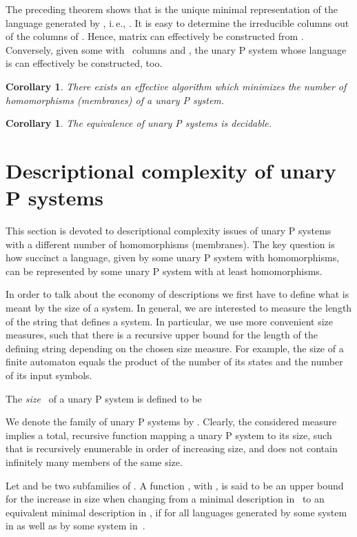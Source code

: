 \documentclass[copyright]{eptcs}
\newtheorem{corollary}[theorem]{Corollary}
\begin{document}
The preceding theorem shows that  is the unique minimal representation of the language generated
by , i.\,e., . It is easy to determine the irreducible columns out of the 
columns of . Hence, matrix  can effectively be
constructed from . Conversely, given some  with~ columns and , the unary P system  whose
language is  can
effectively be constructed, too.

\begin{corollary}
There exists an effective algorithm which minimizes the number of
homomorphisms (membranes) of a unary P system.
\end{corollary}

\begin{corollary}
The equivalence of unary P systems is decidable.
\end{corollary}

\section{Descriptional complexity of unary P systems}

This section is devoted to descriptional complexity issues of unary P
systems with a different number of homomorphisms (membranes). The key
question is how succinct a language, given by some unary P system with 
homomorphisms, can be represented by some unary P system with at least 
homomorphisms.

In order to talk about the economy of descriptions we first have to define
what is meant by the size of a system. In general, we are interested to
measure the length of the string that defines a system. In particular, we
use more convenient size measures, such that there is a recursive upper
bound for the length of the defining string depending on the chosen size
measure. For example, the size of a finite automaton equals the product of
the number of its states and the number of its input symbols.

The \textit{size}~ of a unary P system  is defined to be 


We denote the family of unary P systems by . Clearly, the
considered measure implies a total, recursive function mapping a unary P
system to its size, such that  is recursively enumerable in
order of increasing size, and does not contain infinitely many members of
the same size.

Let  and  be two subfamilies of . A function , with , is said to be an upper bound for the increase in size when changing
from a minimal description in~ to an equivalent minimal
description in , if 
for all languages  generated by some system in  as well
as by some system in~.
\end{document}
